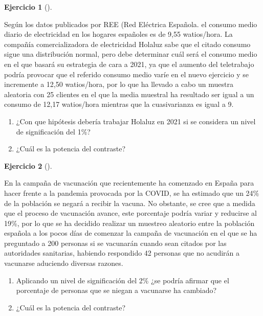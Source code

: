 \documentclass[
  a4paper,
]{scrreport}
\theoremstyle{definition}
\newtheorem{exercise}{Ejercicio}[chapter]
\theoremstyle{remark}
\begin{document}
\begin{exercise}[]\protect\hypertarget{exr-contraste-media-consumo-electrico}{}\label{exr-contraste-media-consumo-electrico}

Según los datos publicados por REE (Red Eléctrica Española. el consumo
medio diario de electricidad en los hogares españoles es de 9,55
watios/hora. La compañía comercializadora de electricidad Holaluz sabe
que el citado consumo sigue una distribución normal, pero debe
determinar cuál será el consumo medio en el que basará su estrategia de
cara a 2021, ya que el aumento del teletrabajo podría provocar que el
referido consumo medio varíe en el nuevo ejercicio y se incremente a
12,50 watios/hora, por lo que ha llevado a cabo un muestra aleatoria con
25 clientes en el que la media muestral ha resultado ser igual a un
consumo de 12,17 watios/hora mientras que la cuasivarianza es igual a 9.

\begin{enumerate}
\def\labelenumi{\alph{enumi}.}
\item
  ¿Con que hipótesis debería trabajar Holaluz en 2021 si se considera un
  nivel de significación del 1\%?
\item
  ¿Cuál es la potencia del contraste?
\end{enumerate}

\end{exercise}

\begin{exercise}[]\protect\hypertarget{exr-contraste-proporcion-vacunados-covid}{}\label{exr-contraste-proporcion-vacunados-covid}

En la campaña de vacunación que recientemente ha comenzado en España
para hacer frente a la pandemia provocada por la COVID, se ha estimado
que un 24\% de la población se negará a recibir la vacuna. No obstante,
se cree que a medida que el proceso de vacunación avance, este
porcentaje podría variar y reducirse al 19\%, por lo que se ha decidido
realizar un muestreo aleatorio entre la población española a los pocos
días de comenzar la campaña de vacunación en el que se ha preguntado a
200 personas si se vacunarán cuando sean citados por las autoridades
sanitarias, habiendo respondido 42 personas que no acudirán a vacunarse
aduciendo diversas razones.

\begin{enumerate}
\def\labelenumi{\alph{enumi}.}
\item
  Aplicando un nivel de significación del 2\% ¿se podría afirmar que el
  porcentaje de personas que se niegan a vacunarse ha cambiado?
\item
  ¿Cuál es la potencia del contraste?
\end{enumerate}

\end{exercise}
\end{document}
